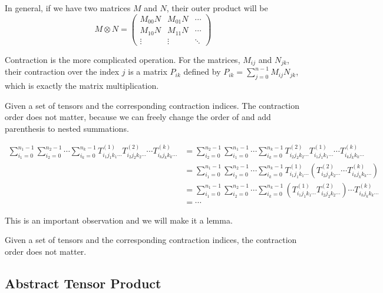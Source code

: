 In general, if we have two matrices $M$ and $N$, their outer product will be 
\begin{equation}
	M \otimes N = 
	\begin{pmatrix}
		M_{00} N & M_{01} N & \cdots \\
		M_{10} N & M_{11} N & \cdots \\
		\vdots & \vdots & \ddots
	\end{pmatrix}
\end{equation}

Contraction is the more complicated operation. 
For the matrices, $M_{ij}$ and $N_{jk}$, their contraction over the index $j$ is a matrix $P_{ik}$ defined by $P_{ik} = \sum_{j=0}^{n-1} M_{ij} N_{jk}$, which is exactly the matrix multiplication.

Given a set of tensors and the corresponding contraction indices. 
The contraction order does not matter, because we can freely change the order of and add parenthesis to nested summations.

\begin{equation}
	\begin{split}
		\sum_{i_1=0}^{n_1-1} \sum_{i_2=0}^{n_2-1} \cdots \sum_{i_k=0}^{n_k-1} T^{(1)}_{i_1 j_1 k_1 \cdots} T^{(2)}_{i_2 j_2 k_2 \cdots} \cdots T^{(k)}_{i_k j_k k_k \cdots} 
		&=
		\sum_{i_2=0}^{n_2-1} \sum_{i_1=0}^{n_1-1} \cdots \sum_{i_k=0}^{n_k-1} T^{(2)}_{i_2 j_2 k_2 \cdots} T^{(1)}_{i_1 j_1 k_1 \cdots} \cdots T^{(k)}_{i_k j_k k_k \cdots} \\ 
		&= \sum_{i_1=0}^{n_1-1} \sum_{i_2=0}^{n_2-1} \cdots \sum_{i_k=0}^{n_k-1} T^{(1)}_{i_1 j_1 k_1 \cdots} \left( T^{(2)}_{i_2 j_2 k_2 \cdots} \cdots T^{(k)}_{i_k j_k k_k \cdots} \right) \\
		&= \sum_{i_1=0}^{n_1-1} \sum_{i_2=0}^{n_2-1} \cdots \sum_{i_k=0}^{n_k-1} \left( T^{(1)}_{i_1 j_1 k_1 \cdots} T^{(2)}_{i_2 j_2 k_2 \cdots} \right) \cdots T^{(k)}_{i_k j_k k_k \cdots} \\
		&= \cdots
	\end{split}
\end{equation}\label{eq:contraction-order}

This is an important observation and we will make it a lemma. 
\begin{lemma}
	Given a set of tensors and the corresponding contraction indices, the contraction order does not matter.
\end{lemma} \label{lem:contraction-order}

\subsection{Abstract Tensor Product}\label{sec:abstract-tensor-product}

